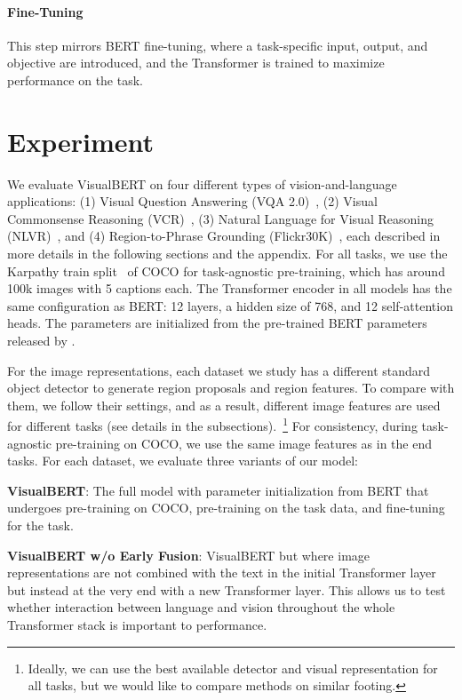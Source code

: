 \documentclass{article} \usepackage{iclr2019_conference,times}
\newcommand{\model}{VisualBERT\xspace}
\newcommand{\nlvr}{NLVR\xspace}
\newcommand{\bert}{BERT\xspace}
\newcommand{\modelby}{VisualBERT w/o Early Fusion\xspace}
\newcommand{\modelp}{VisualBERT\xspace}
\begin{document}
\paragraph{Fine-Tuning}
This step mirrors BERT fine-tuning, where a task-specific input, output, and objective are introduced, and the Transformer is trained to maximize performance on the task. \section{Experiment}
\label{experiment}
We evaluate \model on four different types of vision-and-language applications:
(1) Visual Question Answering (VQA 2.0)~\citep{balanced_vqa_v2}, (2) Visual Commonsense Reasoning (VCR)~\citep{zellers2019recognition},
(3) Natural Language for Visual Reasoning (\nlvr)~\citep{suhr2018corpus}, and (4) Region-to-Phrase Grounding (Flickr30K)~\citep{plummer2015flickr30k}, each described in more details in the following sections and the appendix.
For all tasks, we use the Karpathy train split~\citep{karpathy2015deep} of COCO for task-agnostic pre-training, which has around 100k images with 5 captions each. The Transformer encoder in all models has the same configuration as \bert: 12 layers, a hidden size of 768, and 12 self-attention heads. The parameters are initialized from the pre-trained \bert parameters released by \citet{devlin2018bert}.

For the image representations, each dataset we study has a different standard object detector to generate region proposals and region features. To compare with them, we follow their settings, and as a result, different image features are used for different tasks (see details in the subsections).~\footnote{Ideally, we can use the best available detector and visual representation for all tasks, but we would like to compare methods on similar footing.} For consistency, during task-agnostic pre-training on COCO, we use the same image features as in the end tasks.
For each dataset, we evaluate three variants of our model: 

\textbf{\modelp}: The full model with parameter initialization from BERT that undergoes pre-training on COCO, pre-training on the task data, and fine-tuning for the task. 

\textbf{\modelby}: \model but where image representations are not combined with the text in the initial Transformer layer but instead at the very end with a new Transformer layer. 
This allows us to test whether interaction between language and vision throughout the whole Transformer stack is important to performance.
\end{document}
